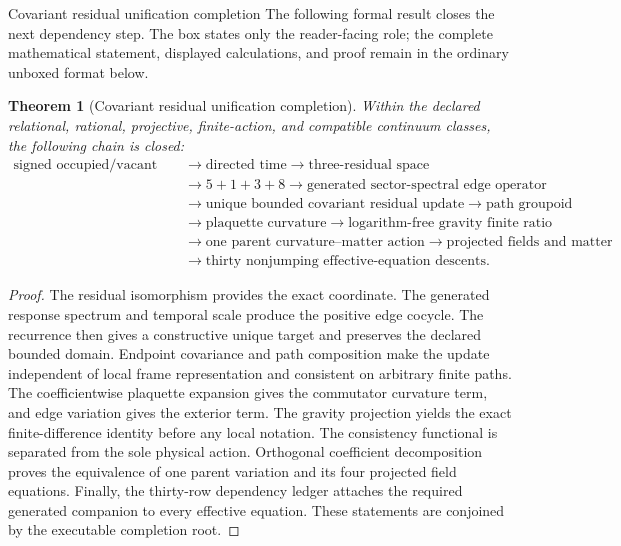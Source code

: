 \documentclass[11pt]{article}
\numberwithin{equation}{section}
\newtheorem{theorem}[definition]{Theorem}
\theoremstyle{remark}
\begin{document}
\begin{proofguide}{Covariant residual unification completion}
The following formal result closes the next dependency step. The box states only the reader-facing role; the complete mathematical statement, displayed calculations, and proof remain in the ordinary unboxed format below.
\end{proofguide}
\begin{theorem}[Covariant residual unification completion]
Within the declared relational, rational, projective, finite-action, and compatible continuum classes, the following chain is closed:
\begin{equation}
\begin{aligned}
\text{signed occupied/vacant grammar}
&\to\text{directed time}
\to\text{three-residual space}\\
&\to 5+1+3+8
\to\text{generated sector-spectral edge operator}\\
&\to\text{unique bounded covariant residual update}
\to\text{path groupoid}\\
&\to\text{plaquette curvature}
\to\text{logarithm-free gravity finite ratio}\\
&\to\text{one parent curvature--matter action}
\to\text{projected fields and matter}\\
&\to\text{thirty nonjumping effective-equation descents}.
\end{aligned}
\label{eq:centralunificationchain}
\end{equation}
\end{theorem}
\begin{proof}
The residual isomorphism provides the exact coordinate.  The generated response spectrum and temporal scale produce the positive edge cocycle.  The recurrence then gives a constructive unique target and preserves the declared bounded domain.  Endpoint covariance and path composition make the update independent of local frame representation and consistent on arbitrary finite paths.  The coefficientwise plaquette expansion gives the commutator curvature term, and edge variation gives the exterior term.  The gravity projection yields the exact finite-difference identity before any local notation.  The consistency functional is separated from the sole physical action.  Orthogonal coefficient decomposition proves the equivalence of one parent variation and its four projected field equations.  Finally, the thirty-row dependency ledger attaches the required generated companion to every effective equation.  These statements are conjoined by the executable completion root.
\end{proof}
\end{document}
